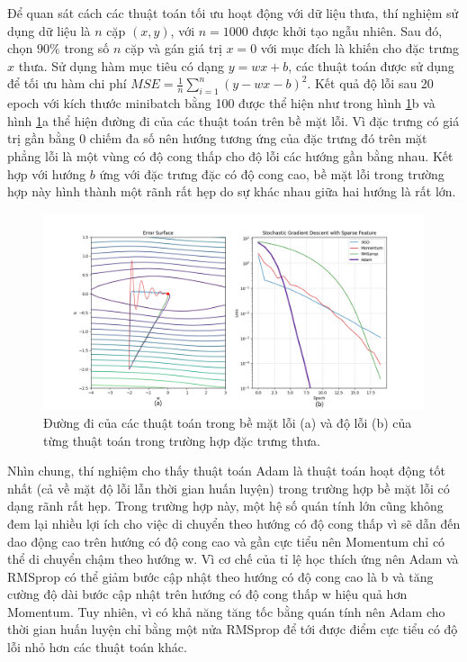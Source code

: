 Để quan sát cách các thuật toán tối ưu hoạt động với dữ liệu thưa, thí nghiệm sử dụng dữ liệu là $n$ cặp $(x,y)$, với $n = 1000$ được khởi tạo ngẫu nhiên. Sau đó, chọn $90\%$ trong số $n$ cặp và gán giá trị $x = 0$ với mục đích là khiến cho đặc trưng $x$ thưa. Sử dụng hàm mục tiêu có dạng $y = wx + b$, các thuật toán được sử dụng để tối ưu hàm chi phí $MSE = \frac{1}{n}\sum_{i=1}^n(y - wx - b)^2$. Kết quả độ lỗi sau 20 epoch với kích thước minibatch bằng 100 được thể hiện như trong hình \ref{fig:sparse}b và hình \ref{fig:sparse}a thể hiện đường đi của các thuật toán trên bề mặt lỗi. Vì đặc trưng có giá trị gần bằng 0 chiếm đa số nên hướng tương ứng của đặc trưng đó trên mặt phẳng lỗi là một vùng có độ cong thấp cho độ lỗi các hướng gần bằng nhau. Kết hợp với hướng $b$ ứng với đặc trưng đặc có độ cong cao, bề mặt lỗi trong trường hợp này hình thành một rãnh rất hẹp do sự khác nhau giữa hai hướng là rất lớn.

\begin{figure}[htp]
	\centering
	\includegraphics[width=130 mm]{images/sparse.png}
	\caption{Đường đi của các thuật toán trong bề mặt lỗi (a) và độ lỗi (b) của từng thuật toán trong trường hợp đặc trưng thưa.}
	\label{fig:sparse}
\end{figure}

Nhìn chung, thí nghiệm cho thấy thuật toán Adam là thuật toán hoạt động tốt nhất (cả về mặt độ lỗi lẫn thời gian huấn luyện) trong trường hợp bề mặt lỗi có dạng rãnh rất hẹp. Trong trường hợp này, một hệ số quán tính lớn cũng không đem lại nhiều lợi ích cho việc di chuyển theo hướng có độ cong thấp vì sẽ dẫn đến dao động cao trên hướng có độ cong cao và gần cực tiểu nên Momentum chỉ có thể di chuyển chậm theo hướng w. Vì cơ chế của tỉ lệ học thích ứng nên Adam và RMSprop có thể giảm bước cập nhật theo hướng có độ cong cao là b và tăng cường độ dài bước cập nhật trên hướng có độ cong thấp w hiệu quả hơn Momentum. Tuy nhiên, vì có khả năng tăng tốc bằng quán tính nên Adam cho thời gian huấn luyện chỉ bằng một nửa RMSprop để tới được điểm cực tiểu có độ lỗi nhỏ hơn các thuật toán khác.

